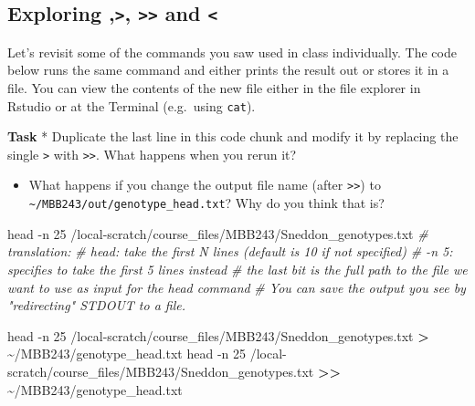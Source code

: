 \documentclass[
]{article}
\newenvironment{Shaded}{\begin{snugshade}}{\end{snugshade}}
\newcommand{\AttributeTok}[1]{\textcolor[rgb]{0.77,0.63,0.00}{#1}}
\newcommand{\CommentTok}[1]{\textcolor[rgb]{0.56,0.35,0.01}{\textit{#1}}}
\newcommand{\FunctionTok}[1]{\textcolor[rgb]{0.00,0.00,0.00}{#1}}
\newcommand{\NormalTok}[1]{#1}
\newcommand{\OperatorTok}[1]{\textcolor[rgb]{0.81,0.36,0.00}{\textbf{#1}}}
\providecommand{\tightlist}{%
  \setlength{\itemsep}{0pt}\setlength{\parskip}{0pt}}
\begin{document}
\hypertarget{exploring-and}{%
\subsection{\texorpdfstring{Exploring
\texttt{\textbar{}},\texttt{\textgreater{}},
\texttt{\textgreater{}\textgreater{}} and
\texttt{\textless{}}}{Exploring \textbar,\textgreater, \textgreater\textgreater{} and \textless{}}}\label{exploring-and}}

Let's revisit some of the commands you saw used in class individually.
The code below runs the same command and either prints the result out or
stores it in a file. You can view the contents of the new file either in
the file explorer in Rstudio or at the Terminal (e.g.~using
\texttt{cat}).

\textbf{Task} * Duplicate the last line in this code chunk and modify it
by replacing the single \texttt{\textgreater{}} with
\texttt{\textgreater{}\textgreater{}}. What happens when you rerun it?

\begin{itemize}
\tightlist
\item
  What happens if you change the output file name (after
  \texttt{\textgreater{}\textgreater{}}) to
  \texttt{\textasciitilde{}/MBB243/out/genotype\_head.txt}? Why do you
  think that is?
\end{itemize}

\begin{Shaded}
\begin{Highlighting}[]
\FunctionTok{head} \AttributeTok{{-}n}\NormalTok{ 25 /local{-}scratch/course\_files/MBB243/Sneddon\_genotypes.txt}
\CommentTok{\# translation:}
\CommentTok{\# head: take the first N lines (default is 10 if not specified)}
\CommentTok{\# {-}n 5: specifies to take the first 5 lines instead}
\CommentTok{\# the last bit is the full path to the file we want to use as input for the head command}
\CommentTok{\# You can save the output you see by "redirecting" STDOUT to a file. }

\FunctionTok{head} \AttributeTok{{-}n}\NormalTok{ 25 /local{-}scratch/course\_files/MBB243/Sneddon\_genotypes.txt }\OperatorTok{\textgreater{}}\NormalTok{ \textasciitilde{}/MBB243/genotype\_head.txt}
\FunctionTok{head} \AttributeTok{{-}n}\NormalTok{ 25 /local{-}scratch/course\_files/MBB243/Sneddon\_genotypes.txt }\OperatorTok{\textgreater{}\textgreater{}}\NormalTok{ \textasciitilde{}/MBB243/genotype\_head.txt}
\end{Highlighting}
\end{Shaded}
\end{document}
